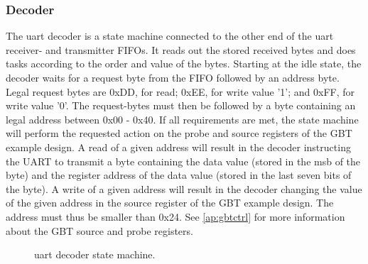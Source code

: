 \documentclass[main.tex]{subfiles}
\begin{document}
\subsubsection{Decoder}
The \gls{uart} decoder is a state machine connected to the other end of the \gls{uart} receiver- and transmitter FIFOs. It reads out the stored received bytes and does tasks according to the order and value of the bytes. Starting at the idle state, the decoder waits for a request byte from the FIFO followed by an address byte. Legal request bytes are 0xDD, for read; 0xEE, for write value '1'; and 0xFF, for write value '0'. The request-bytes must then be followed by a byte containing an legal address between 0x00 - 0x40. If all requirements are met, the state machine will perform the requested action on the probe and source registers of the GBT example design. A read of a given address will result in the decoder instructing the UART to transmit a byte containing the data value (stored in the \gls{msb} of the byte) and the register address of the data value (stored in the last seven bits of the byte). A write of a given address will result in the decoder changing the value of the given address in the source register of the GBT example design. The address must thus be smaller than 0x24. See \ref{ap:gbtctrl} for more information about the GBT source and probe registers.

\begin{figure}[!b]
\begin{center}
\caption{\gls{uart} decoder state machine.}
\label{fig:uartdec}
\end{center}
\end{figure}  
\end{document}
